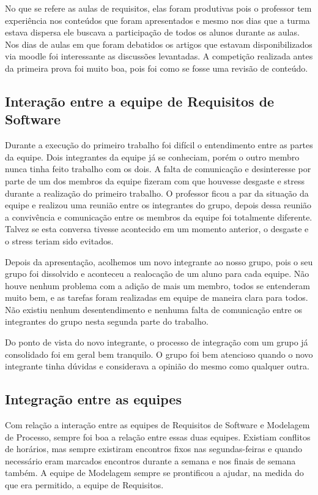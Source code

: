 No que se refere as aulas de requisitos, elas foram produtivas pois o professor tem experiência nos conteúdos que foram apresentados e mesmo nos dias que a turma estava dispersa ele buscava a participação de todos os alunos durante as aulas. Nos   dias de aulas em que foram debatidos  os artigos que estavam  disponibilizados via moodle foi interessante as discussões levantadas. A competição realizada antes da primeira prova foi muito boa, pois foi como se fosse uma revisão de conteúdo. 

\subsection{Interação entre a equipe de Requisitos de Software}
Durante a execução do primeiro trabalho foi difícil o entendimento entre as partes da equipe. Dois integrantes da equipe já se conheciam, porém o outro membro nunca tinha feito trabalho com os dois. A falta de comunicação e desinteresse por parte de um dos membros da equipe fizeram com que houvesse desgaste e stress durante a realização do primeiro trabalho. O professor ficou a par da situação da equipe e realizou uma reunião entre os integrantes do grupo, depois dessa reunião a convivência e comunicação entre os membros da equipe foi totalmente diferente. Talvez se esta conversa tivesse acontecido em um momento anterior, o desgaste e o stress teriam sido evitados.

Depois da apresentação, acolhemos um novo integrante ao nosso grupo, pois o seu grupo foi dissolvido e aconteceu a realocação de um aluno para cada equipe. Não houve nenhum problema com a adição de mais um membro, todos se entenderam muito bem, e as tarefas foram realizadas em equipe de maneira clara para todos. Não existiu nenhum desentendimento e nenhuma falta de comunicação entre os integrantes do grupo nesta segunda parte do trabalho.

Do ponto de vista do novo integrante, o processo de integração com um grupo já consolidado foi em geral bem tranquilo. O grupo foi bem atencioso quando o novo integrante tinha dúvidas e considerava a opinião do mesmo como qualquer outra.

\subsection{Integração entre as equipes}
Com relação a interação entre as equipes de Requisitos de Software e Modelagem de Processo, sempre foi boa a relação  entre essas duas equipes. Existiam conflitos de horários, mas sempre existiram encontros fixos nas segundas-feiras e quando necessário eram marcados encontros durante a semana e nos finais de semana também. A equipe de Modelagem  sempre se prontificou a ajudar, na medida do que era permitido, a equipe de Requisitos. 

